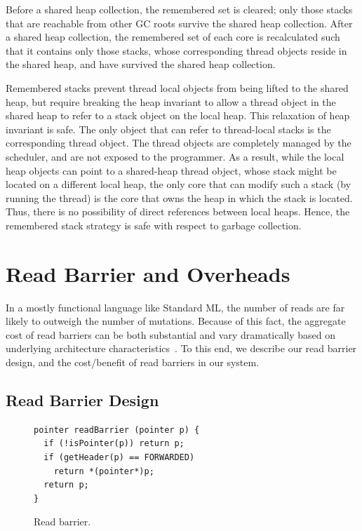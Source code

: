 Before a shared heap collection, the remembered set is cleared; only those
stacks that are reachable from other GC roots survive the shared heap
collection. After a shared heap collection, the remembered set of each core is
recalculated such that it contains only those stacks, whose corresponding
thread objects reside in the shared heap, and have survived the shared heap
collection.

Remembered stacks prevent thread local objects from being lifted to the shared
heap, but require breaking the heap invariant to allow a thread object in the
shared heap to refer to a stack object on the local heap. This relaxation of
heap invariant is safe. The only object that can refer to thread-local stacks
is the corresponding thread object. The thread objects are completely managed
by the scheduler, and are not exposed to the programmer. As a result, while the
local heap objects can point to a shared-heap thread object, whose stack might
be located on a different local heap, the only core that can modify such a
stack (by running the thread) is the core that owns the heap in which the stack
is located. Thus, there is no possibility of direct references between local
heaps. Hence, the remembered stack strategy is safe with respect to garbage
collection.

\section{Read Barrier and Overheads}

In a mostly functional language like Standard ML, the number of reads are far
likely to outweigh the number of mutations. Because of this fact, the aggregate
cost of read barriers can be both substantial and vary dramatically based on
underlying architecture characteristics~\cite{Blackburn04}. To this end, we
describe our read barrier design, and the cost/benefit of read barriers in our
system.

\subsection{Read Barrier Design}

\begin{figure}
\begin{lstlisting}
pointer readBarrier (pointer p) {
  if (!isPointer(p)) return p;
  if (getHeader(p) == FORWARDED)
    return *(pointer*)p;
  return p;
}
\end{lstlisting}
\caption{Read barrier.}
\label{code:read_barrier}
\end{figure}

